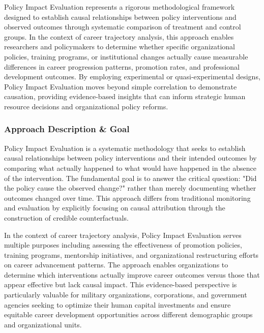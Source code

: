 \documentclass[main.tex]{subfiles}
\begin{document}
Policy Impact Evaluation represents a rigorous methodological framework designed to establish causal relationships between policy interventions and observed outcomes through systematic comparison of treatment and control groups. In the context of career trajectory analysis, this approach enables researchers and policymakers to determine whether specific organizational policies, training programs, or institutional changes actually cause measurable differences in career progression patterns, promotion rates, and professional development outcomes. By employing experimental or quasi-experimental designs, Policy Impact Evaluation moves beyond simple correlation to demonstrate causation, providing evidence-based insights that can inform strategic human resource decisions and organizational policy reforms.

\subsubsection{Approach Description \& Goal}

Policy Impact Evaluation is a systematic methodology that seeks to establish causal relationships between policy interventions and their intended outcomes by comparing what actually happened to what would have happened in the absence of the intervention\parencite{impact_eval_methods,causality-policy}. The fundamental goal is to answer the critical question: "Did the policy cause the observed change?" rather than merely documenting whether outcomes changed over time\parencite{impact_eval_methods}. This approach differs from traditional monitoring and evaluation by explicitly focusing on causal attribution through the construction of credible counterfactuals\parencite{impact_eval_glossary,quasi_exp_worldbank}.

In the context of career trajectory analysis, Policy Impact Evaluation serves multiple purposes including assessing the effectiveness of promotion policies, training programs, mentorship initiatives, and organizational restructuring efforts on career advancement patterns\parencite{career_pathways_meta}. The approach enables organizations to determine which interventions actually improve career outcomes versus those that appear effective but lack causal impact\parencite{impact_eval_methods}. This evidence-based perspective is particularly valuable for military organizations, corporations, and government agencies seeking to optimize their human capital investments and ensure equitable career development opportunities across different demographic groups and organizational units.
\end{document}
